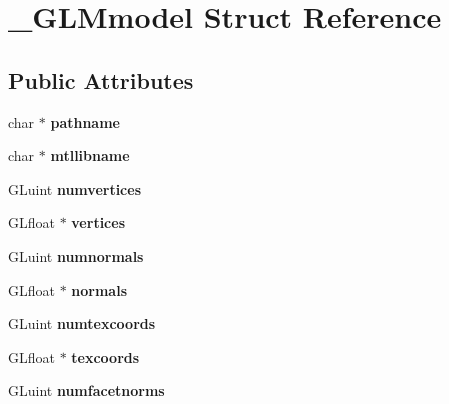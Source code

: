 \hypertarget{struct__GLMmodel}{\section{\-\_\-\-G\-L\-Mmodel \-Struct \-Reference}
\label{struct__GLMmodel}
}
\subsection*{\-Public \-Attributes}
\begin{DoxyCompactItemize}
\item 
\hypertarget{struct__GLMmodel_a06f09c6f9c93cec84232e848a0ce1b2b}{char $\ast$ {\bfseries pathname}}\label{struct__GLMmodel_a06f09c6f9c93cec84232e848a0ce1b2b}

\item 
\hypertarget{struct__GLMmodel_ab36e68f85a3764bfccf971d8b5ed26df}{char $\ast$ {\bfseries mtllibname}}\label{struct__GLMmodel_ab36e68f85a3764bfccf971d8b5ed26df}

\item 
\hypertarget{struct__GLMmodel_ad74d64597f256d85581f1c76a1e82243}{\-G\-Luint {\bfseries numvertices}}\label{struct__GLMmodel_ad74d64597f256d85581f1c76a1e82243}

\item 
\hypertarget{struct__GLMmodel_accb67311836e00c90c63e826fa58afe1}{\-G\-Lfloat $\ast$ {\bfseries vertices}}\label{struct__GLMmodel_accb67311836e00c90c63e826fa58afe1}

\item 
\hypertarget{struct__GLMmodel_ab6ab634af259da990dd343da8bb97d60}{\-G\-Luint {\bfseries numnormals}}\label{struct__GLMmodel_ab6ab634af259da990dd343da8bb97d60}

\item 
\hypertarget{struct__GLMmodel_aca8d6dea87a04f72b55ad5ddffbd4102}{\-G\-Lfloat $\ast$ {\bfseries normals}}\label{struct__GLMmodel_aca8d6dea87a04f72b55ad5ddffbd4102}

\item 
\hypertarget{struct__GLMmodel_ab53fcb80ed1c4ec402c1254bed586772}{\-G\-Luint {\bfseries numtexcoords}}\label{struct__GLMmodel_ab53fcb80ed1c4ec402c1254bed586772}

\item 
\hypertarget{struct__GLMmodel_ab8634a9fd02c2b5f6a8b2d4e77823f65}{\-G\-Lfloat $\ast$ {\bfseries texcoords}}\label{struct__GLMmodel_ab8634a9fd02c2b5f6a8b2d4e77823f65}

\item 
\hypertarget{struct__GLMmodel_a087b8336cb092076d6b259a5be9a17a7}{\-G\-Luint {\bfseries numfacetnorms}}\label{struct__GLMmodel_a087b8336cb092076d6b259a5be9a17a7}


\end{DoxyCompactItemize}
